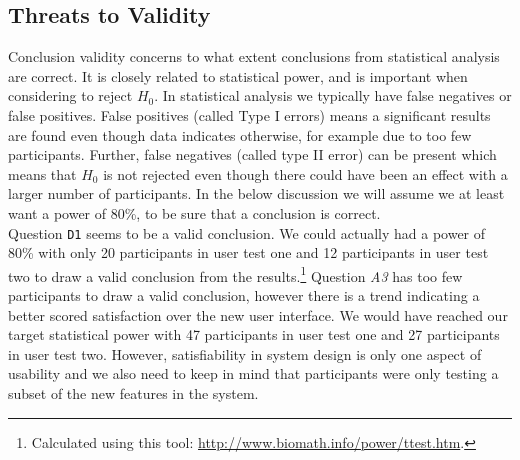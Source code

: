 

\subsection{Threats to Validity}
\label{sub-sec:user-test-validity}
Conclusion validity concerns to what extent conclusions from statistical analysis are correct. It is closely related to statistical power, and is important when considering to reject $H_0$. In statistical analysis we typically have false negatives or false positives. False positives (called Type I errors) means a significant results are found even though data indicates otherwise, for example due to too few participants. Further, false negatives (called type II error) can be present which means that $H_0$ is not rejected even though there could have been an effect with a larger number of participants. In the below discussion we will assume we at least want a power of 80\%, to be sure that a conclusion is correct. \\

Question \texttt{D1} seems to be a valid conclusion. We could actually had a power of 80\% with only 20 participants in user test one and 12 participants in user test two to draw a valid conclusion from the results.\footnote{Calculated using this tool: \url{http://www.biomath.info/power/ttest.htm}.} Question \textit{A3} has too few participants to draw a valid conclusion, however there is a trend indicating a better scored satisfaction over the new user interface. We would have reached our target statistical power with 47 participants in user test one and 27 participants in user test two. However, satisfiability in system design is only one aspect of usability and we also need to keep in mind that participants were only testing a subset of the new features in the system. \\

